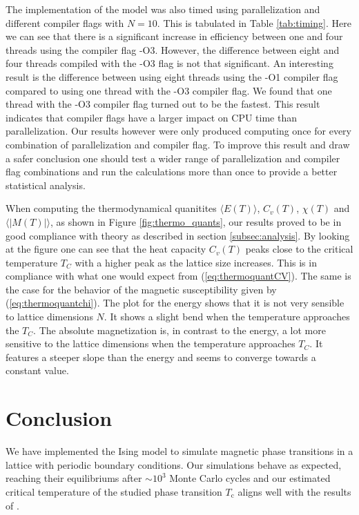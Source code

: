 \documentclass[twocolumn]{aastex62}
\begin{document}
The implementation of the model was also timed using parallelization and
different compiler flags with $N=10$. This is tabulated in Table \ref{tab:timing}. Here we
can see that there is a significant increase in efficiency between one and four
threads using the compiler flag -O3. However, the difference between eight and four
threads compiled with the -O3 flag is not that significant. An interesting
result is the difference between using eight threads using the -O1 compiler flag
compared to using one thread with the -O3 compiler flag. We found that one
thread with the -O3 compiler flag turned out to be the fastest. This result
indicates that compiler flags have a larger impact on CPU time than
parallelization. Our results however were only produced computing once for every
combination of parallelization and compiler flag. To improve this result and
draw a safer conclusion one should test a wider range of parallelization and
compiler flag combinations and run the calculations more than once to provide a
better statistical analysis.\\\indent

When computing the thermodynamical quanitites $\langle E(T) \rangle$,  $C_v(T)$,
$\chi(T)$ and $\langle \vert M(T) \vert \rangle$, as shown in Figure
\ref{fig:thermo_quants}, our results proved to be in good compliance with theory
as described in section \ref{subsec:analysis}. By looking at the figure one can
see that the heat capacity $C_v(T)$ peaks close to the critical temperature
$T_C$ with a higher peak as the lattice size increases. This is in compliance
with what one would expect from (\ref{eq:thermoquantCV}). The same is the case
for the behavior of the magnetic susceptibility given by
(\ref{eq:thermoquantchi}). The plot for the energy shows that it is not very sensible
to lattice dimensions $N$. It shows a slight bend when the temperature
approaches the $T_C$. The absolute magnetization is, in contrast to the energy,
a lot more sensitive to the lattice dimensions when the temperature approaches
$T_C$. It features a steeper slope than the energy and seems to converge towards
a constant value. 




\section{Conclusion} \label{sec:conclusion}
We have implemented the Ising model to simulate magnetic phase
transitions in a lattice with periodic boundary conditions. Our
simulations behave as expected, reaching their equilibriums after
$\sim 10^3$ Monte Carlo cycles and our estimated critical
temperature of the studied phase transition  $T_\text{c}$ aligns
well with the results of \cite{onsager:1944}.
\end{document}
